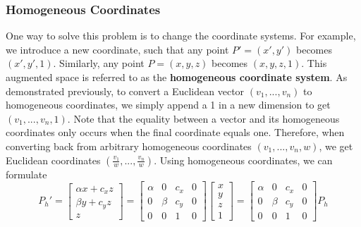 \documentclass[a4paper, 12pt]{article}
\renewcommand\emph{\textbf}
\begin{document}
\subsubsection{Homogeneous Coordinates}

One way to solve this problem is to change the coordinate systems. For example, we introduce a new coordinate, such that any point $P' =(x',y')$ becomes $(x',y',1)$. Similarly, any point $P =(x,y,z)$ becomes $(x,y,z,1)$. This augmented space is referred to as the \emph{homogeneous coordinate system}. As demonstrated previously, to convert a Euclidean vector $(v_1,...,v_n)$ to homogeneous coordinates, we simply append a 1 in a new dimension to get $(v_1,...,v_n,1)$. Note that the equality between a vector and its homogeneous coordinates only occurs when the final coordinate equals one. Therefore, when converting back from arbitrary homogeneous coordinates $(v_1,  ... , v_n , w)$, we get Euclidean coordinates $(\frac{v_1}{w},...,\frac{v_n}{w})$. Using homogeneous coordinates, we can formulate
\begin{equation}
    P_h' = \begin{bmatrix}\alpha x + c_xz\\\beta y + c_yz \\ z\end{bmatrix} = 
    \begin{bmatrix}
    \alpha & 0 & c_x & 0\\
    0 & \beta & c_y & 0 \\ 
    0 & 0 & 1 & 0
    \end{bmatrix}
    \begin{bmatrix}x\\y\\z\\1\end{bmatrix} =     \begin{bmatrix}
    \alpha & 0 & c_x & 0\\
    0 & \beta & c_y & 0 \\ 
    0 & 0 & 1 & 0
    \end{bmatrix} P_h
    \label{eq:homogeneous}
\end{equation}
\end{document}
